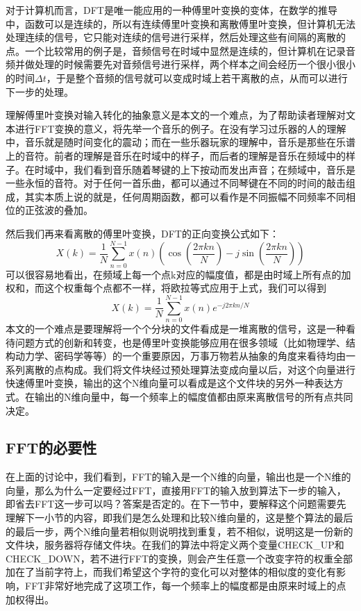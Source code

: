 对于计算机而言，DFT是唯一能应用的一种傅里叶变换的变体，在数学的推导中，函数可以是连续的，所以有连续傅里叶变换和离散傅里叶变换，但计算机无法处理连续的信号，它只能对连续的信号进行采样，然后处理这些有间隔的离散的点。一个比较常用的例子是，音频信号在时域中显然是连续的，但计算机在记录音频并做处理的时候需要先对音频信号进行采样，两个样本之间会经历一个很小很小的时间$\Delta t$，于是整个音频的信号就可以变成时域上若干离散的点，从而可以进行下一步的处理。

理解傅里叶变换对输入转化的抽象意义是本文的一个难点，为了帮助读者理解对文本进行FFT变换的意义，将先举一个音乐的例子。在没有学习过乐器的人的理解中，音乐就是随时间变化的震动；而在一些乐器玩家的理解中，音乐是那些在乐谱上的音符。前者的理解是音乐在时域中的样子，而后者的理解是音乐在频域中的样子。在时域中，我们看到音乐随着琴键的上下按动而发出声音；在频域中，音乐是一些永恒的音符。对于任何一首乐曲，都可以通过不同琴键在不同的时间的敲击组成，其实本质上说的就是，任何周期函数，都可以看作是不同振幅不同频率不同相位的正弦波的叠加。

然后我们再来看离散的傅里叶变换，DFT的正向变换公式如下：$$X(k)=\frac{1}{N}\sum_{n=0}^{N-1}x(n)(\cos(\frac{2\pi kn}{N}) - j\sin(\frac{2\pi kn}{N}))$$可以很容易地看出，在频域上每一个点k对应的幅度值，都是由时域上所有点的加权和，而这个权重每个点都不一样，将欧拉等式应用于上式，我们可以得到$$X(k)=\frac{1}{N}\sum_{n=0}^{N-1}x(n)e^{-j2\pi kn/N}$$本文的一个难点是要理解将一个个分块的文件看成是一堆离散的信号，这是一种看待问题方式的创新和转变，也是傅里叶变换能够应用在很多领域（比如物理学、结构动力学、密码学等等）的一个重要原因，万事万物若从抽象的角度来看待均由一系列离散的点构成。我们将文件块经过预处理算法变成向量以后，对这个向量进行快速傅里叶变换，输出的这个N维向量可以看成是这个文件块的另外一种表达方式。在输出的N维向量中，每一个频率上的幅度值都由原来离散信号的所有点共同决定。

\subsection{FFT的必要性}

在上面的讨论中，我们看到，FFT的输入是一个N维的向量，输出也是一个N维的向量，那么为什么一定要经过FFT，直接用FFT的输入放到算法下一步的输入，即省去FFT这一步可以吗？答案是否定的。在下一节中，要解释这个问题需要先理解下一小节的内容，即我们是怎么处理和比较N维向量的，这是整个算法的最后的最后一步，两个N维向量若相似则说明找到重复，若不相似，说明这是一份新的文件块，服务器将存储文件块。在我们的算法中将定义两个变量CHECK\_UP和CHECK\_DOWN，若不进行FFT的变换，则会产生任意一个改变字符的权重全部加在了当前字符上，而我们希望这个字符的变化可以对整体的相似度的变化有影响，FFT非常好地完成了这项工作，每一个频率上的幅度都是由原来时域上的点加权得出。

